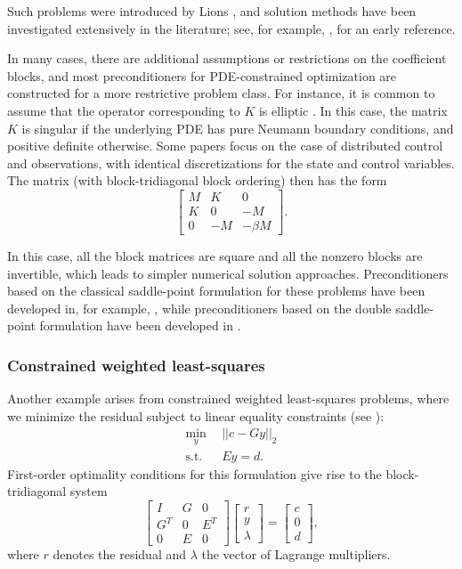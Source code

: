 \documentclass{article}
\begin{document}
Such problems were introduced by Lions \cite{lions1972some}, and solution methods have been investigated  extensively in the literature; see, for example,  \cite{ito1996augmented}, for an early reference.

In many cases, there are additional assumptions or restrictions on the coefficient blocks, and most preconditioners for PDE-constrained optimization are constructed for a more restrictive problem class. For instance, it is common to assume that the operator corresponding to $K$ is elliptic \cite{cfms13,p12}. In this case, the matrix $K$ is singular if the underlying PDE has pure Neumann boundary conditions, and positive definite otherwise. Some papers \cite{cfms13,p12} focus on the case of distributed control and observations, with identical discretizations for the state and control variables. The matrix (with block-tridiagonal block ordering) then has the form
\[
\begin{bmatrix}
    M & K & 0 \\
    K & 0 & -M \\
    0 & -M & -\beta M
\end{bmatrix}.
\]

In this case, all the block matrices are square and all the nonzero blocks are invertible, which leads to simpler numerical solution approaches. Preconditioners based on the classical saddle-point formulation for these problems have been developed in, for example, \cite{krt21,p12,rdw10,SchoeberlZulehner2007}, while preconditioners based on the double saddle-point formulation have been developed in \cite{bsz20,bg22,pp21,sz18}. 

\subsubsection{Constrained weighted least-squares}
Another example arises from constrained weighted least-squares problems, where we  minimize the residual subject to linear equality constraints (see \cite[Chapter 3]{b24}):
\begin{align*}
\min_y \ \ &||c - Gy ||_2\\
\textrm{s.t.} \ \ &Ey = d.
\end{align*}
First-order optimality conditions for this formulation give rise to the block-tridiagonal system
\[
\begin{bmatrix}
    I & G & 0 \\
    G^T & 0 & E^T \\
    0 & E & 0
\end{bmatrix}\begin{bmatrix}
    r \\
    y \\
    \lambda
\end{bmatrix} = \begin{bmatrix}
    c \\
    0 \\
    d
\end{bmatrix},
\]
where $r$ denotes the residual and $\lambda$ the vector of Lagrange multipliers.
\end{document}
